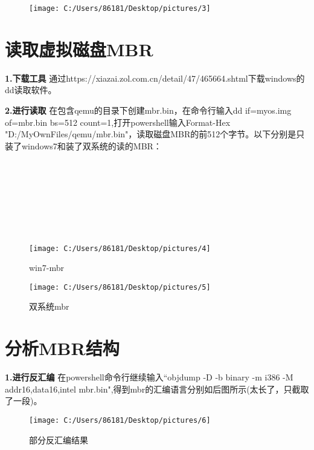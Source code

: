 \documentclass[]{report}
\begin{document}
\begin{figure}[h!]
	\centering
	\texttt{[image: C:/Users/86181/Desktop/pictures/3]}
	\caption{}
	\label{fig:3}
\end{figure}

\section{读取虚拟磁盘MBR}
{\bf 1.下载工具} 通过https://xiazai.zol.com.cn/detail/47/465664.shtml下载windows的dd读取软件。

{\bf 2.进行读取} 在包含qemu的目录下创建mbr.bin，在命令行输入dd if=myos.img of=mbr.bin bs=512 count=1,打开powershell输入Format-Hex "D:/MyOwnFiles/qemu/mbr.bin"，读取磁盘MBR的前512个字节。以下分别是只装了windows7和装了双系统的读的MBR：\\\\\\\\\\\\\\\\
  
\begin{figure}[h!]
	\centering
	\texttt{[image: C:/Users/86181/Desktop/pictures/4]}
	\caption{win7-mbr}
	\label{fig:4}
\end{figure}

\begin{figure}[h!]
	\centering
	\texttt{[image: C:/Users/86181/Desktop/pictures/5]}
	\caption{双系统mbr}
	\label{fig:5}
\end{figure}


\section{分析MBR结构}
{\bf 1.进行反汇编} 在powershell命令行继续输入``objdump -D -b binary -m i386 -M addr16,data16,intel mbr.bin",得到mbr的汇编语言分别如后图所示(太长了，只截取了一段)。

\begin{figure}[h!]
	\centering
	\texttt{[image: C:/Users/86181/Desktop/pictures/6]}
	\caption{部分反汇编结果}
	\label{fig:6}
\end{figure}
\end{document}
